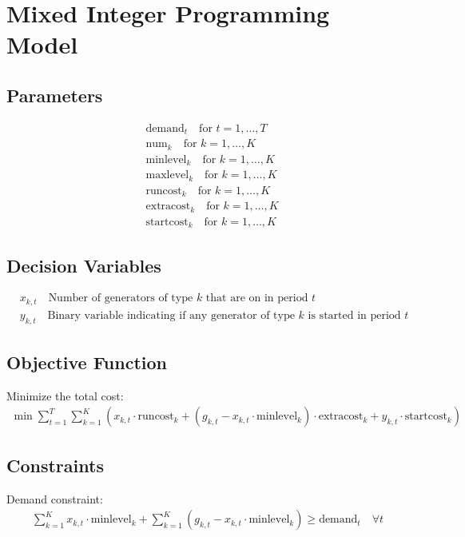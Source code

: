 \documentclass{article}
\begin{document}
\section*{Mixed Integer Programming Model}

\subsection*{Parameters}
\begin{align*}
& \text{demand}_t \quad \text{for } t = 1,\ldots,T \\
& \text{num}_k \quad \text{for } k = 1,\ldots,K \\
& \text{minlevel}_k \quad \text{for } k = 1,\ldots,K \\
& \text{maxlevel}_k \quad \text{for } k = 1,\ldots,K \\
& \text{runcost}_k \quad \text{for } k = 1,\ldots,K \\
& \text{extracost}_k \quad \text{for } k = 1,\ldots,K \\
& \text{startcost}_k \quad \text{for } k = 1,\ldots,K
\end{align*}

\subsection*{Decision Variables}
\begin{align*}
& x_{k,t} \quad \text{Number of generators of type } k \text{ that are on in period } t \\
& y_{k,t} \quad \text{Binary variable indicating if any generator of type } k \text{ is started in period } t
\end{align*}

\subsection*{Objective Function}
Minimize the total cost:
\begin{align*}
\min \sum_{t=1}^{T} \sum_{k=1}^{K} \left( x_{k,t} \cdot \text{runcost}_k + (g_{k,t} - x_{k,t} \cdot \text{minlevel}_k) \cdot \text{extracost}_k + y_{k,t} \cdot \text{startcost}_k \right)
\end{align*}

\subsection*{Constraints}
Demand constraint:
\begin{align*}
\sum_{k=1}^{K} x_{k,t} \cdot \text{minlevel}_k + \sum_{k=1}^{K} (g_{k,t} - x_{k,t} \cdot \text{minlevel}_k) \geq \text{demand}_t \quad \forall t
\end{align*}
\end{document}
